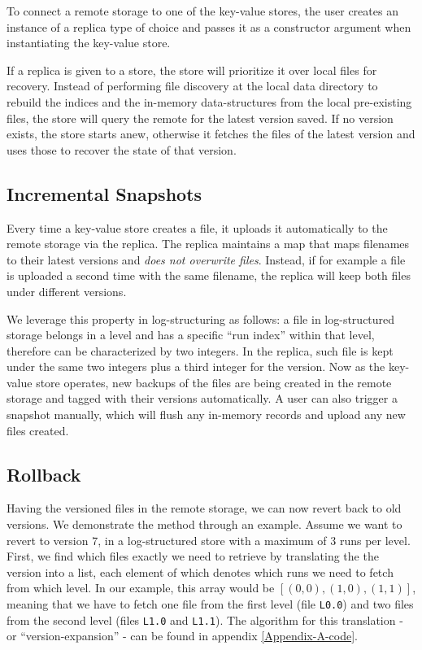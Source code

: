To connect a remote storage to one of the key-value stores, the user creates an instance of a replica type of choice and passes it as a constructor argument when instantiating the key-value store.

If a replica is given to a store, the store will prioritize it over local files for recovery. Instead of performing file discovery at the local data directory to rebuild the indices and the in-memory data-structures from the local pre-existing files, the store will query the remote for the latest version saved. If no version exists, the store starts anew, otherwise it fetches the files of the latest version and uses those to recover the state of that version.

\subsection{Incremental Snapshots}

Every time a key-value store creates a file, it uploads it automatically to the remote storage via the replica. The replica maintains a map that maps filenames to their latest versions and \textit{does not overwrite files}. Instead, if for example a file is uploaded a second time with the same filename, the replica will keep both files under different versions.

We leverage this property in log-structuring as follows: a file in log-structured storage belongs in a level and has a specific ``run index'' within that level, therefore can be characterized by two integers. In the replica, such file is kept under the same two integers plus a third integer for the version. Now as the key-value store operates, new backups of the files are being created in the remote storage and tagged with their versions automatically. A user can also trigger a snapshot manually, which will flush any in-memory records and upload any new files created.

\subsection{Rollback}

Having the versioned files in the remote storage, we can now revert back to old versions.
We demonstrate the method through an example.
Assume we want to revert to version $7$, in a log-structured store with a maximum of $3$ runs per level. First, we find which files exactly we need to retrieve by translating the the version into a list, each element of which denotes which runs we need to fetch from which level. In our example, this array would be $[(0, 0), (1, 0), (1, 1)]$, meaning that we have to fetch one file from the first level (file \verb|L0.0|) and two files from the second level (files \verb|L1.0| and \verb|L1.1|). The algorithm for this translation - or ``version-expansion'' - can be found in appendix \ref{Appendix-A-code}.

